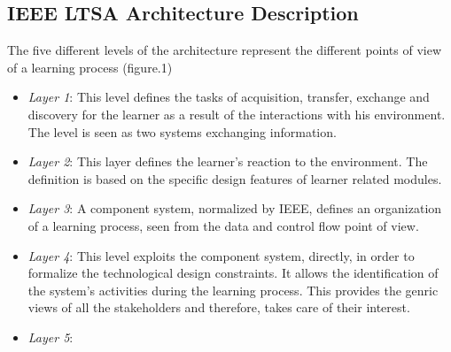 \subsection{IEEE LTSA Architecture Description}
The five different levels of the architecture represent the different points of view of
a learning process\cite{ltsa} (figure.1)
\begin{itemize}
 \item \textit{Layer 1}: This level defines the tasks of acquisition, transfer, exchange and
discovery for the learner as a result of the interactions with his environment. The
level is seen as two systems exchanging information.
 \item \textit{Layer 2}: This layer defines the learner’s reaction to the environment. The
definition is based on the specific design features of learner related modules.
  \item \textit{Layer 3}: A component system, normalized by IEEE, defines an organization
of a learning process, seen from the data and control flow point of view.
  \item \textit{Layer 4}: This level exploits the component system, directly, in order to
formalize the technological design constraints. It allows the identification of the
system’s activities during the learning process. This provides the genric views of
all the stakeholders and therefore, takes care of their interest.
  \item \textit{Layer 5}:  \blindtext
\end{itemize}

